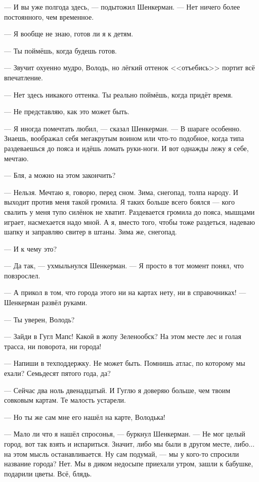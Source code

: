 --- И вы уже полгода здесь, --- подытожил Шенкерман.
--- Нет ничего более постоянного, чем временное.

--- Я вообще не знаю, готов ли я к детям.

--- Ты поймёшь, когда будешь готов.

--- Звучит охуенно мудро, Володь, но лёгкий оттенок <<отъебись>> портит всё впечатление.

--- Нет здесь никакого оттенка.
Ты реально поймёшь, когда придёт время.

--- Не представляю, как это может быть.

--- Я иногда помечтать любил, --- сказал Шенкерман.
--- В шараге особенно.
Знаешь, воображал себя мегакрутым воином или что-то подобное, когда типа раздеваешься до пояса и идёшь ломать руки-ноги.
И вот однажды лежу я себе, мечтаю.

--- Бля, а можно на этом закончить?

--- Нельзя.
Мечтаю я, говорю, перед сном.
Зима, снегопад, толпа народу.
И выходит против меня такой громила.
Я таких больше всего боялся --- кого свалить у меня тупо силёнок не хватит.
Раздевается громила до пояса, мышцами играет, насмехается надо мной.
А я, вместо того, чтобы тоже раздеться, надеваю шапку и заправляю свитер в штаны.
Зима же, снегопад.

--- И к чему это?

--- Да так, --- ухмыльнулся Шенкерман.
--- Я просто в тот момент понял, что повзрослел.

\asterism

\textspace

--- А прикол в том, что города этого ни на картах нету, ни в справочниках! --- Шенкерман развёл руками.

--- Ты уверен, Володь?

--- Зайди в Гугл Мапс!
Какой в жопу Зеленообск?
На этом месте лес и голая трасса, ни поворота, ни города!

--- Напиши в техподдержку.
Не может быть.
Помнишь атлас, по которому мы ехали?
Семьдесят пятого года, да?

--- Сейчас два ноль двенадцатый.
И Гуглю я доверяю больше, чем твоим совковым картам.
Те малость устарели.

--- Но ты же сам мне его нашёл на карте, Володька!

--- Мало ли что я нашёл спросонья, --- буркнул Шенкерман.
--- Не мог целый город, вот так взять и испариться.
Значит, либо мы были в другом месте, либо... на этом мысль останавливается.
Ну сам подумай, --- мы у кого-то спросили название города?
Нет.
Мы в диком недосыпе приехали утром, зашли к бабушке, подарили цветы.
Всё, блядь.

